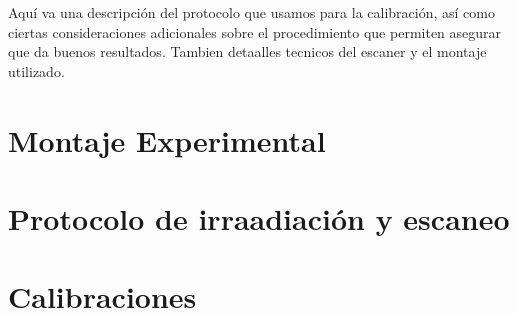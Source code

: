 Aquí va una descripción del protocolo que usamos para la calibración, así como ciertas consideraciones adicionales sobre el procedimiento que permiten  asegurar que da buenos resultados. Tambien detaalles tecnicos del escaner y el montaje utilizado. 
\section{Montaje Experimental}
\section{Protocolo de irraadiación y escaneo}
\section{Calibraciones}